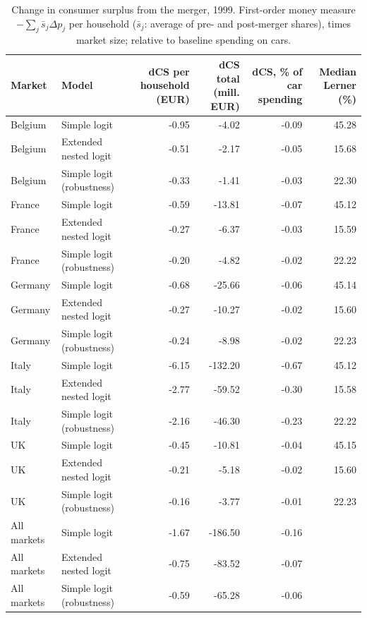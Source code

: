 \begin{table}
\caption{Change in consumer surplus from the merger, 1999. First-order money measure $-\sum_j \bar s_j \Delta p_j$ per household ($\bar s_j$: average of pre- and post-merger shares), times market size; relative to baseline spending on cars.}
\label{tab:consumer_surplus}
\begin{tabular}{llrrrr}
\toprule
Market & Model & dCS per
household (EUR) & dCS total
(mill. EUR) & dCS, \% of
car spending & Median
Lerner (\%) \\
\midrule
Belgium & Simple logit & -0.95 & -4.02 & -0.09 & 45.28 \\
Belgium & Extended nested logit & -0.51 & -2.17 & -0.05 & 15.68 \\
Belgium & Simple logit (robustness) & -0.33 & -1.41 & -0.03 & 22.30 \\
France & Simple logit & -0.59 & -13.81 & -0.07 & 45.12 \\
France & Extended nested logit & -0.27 & -6.37 & -0.03 & 15.59 \\
France & Simple logit (robustness) & -0.20 & -4.82 & -0.02 & 22.22 \\
Germany & Simple logit & -0.68 & -25.66 & -0.06 & 45.14 \\
Germany & Extended nested logit & -0.27 & -10.27 & -0.02 & 15.60 \\
Germany & Simple logit (robustness) & -0.24 & -8.98 & -0.02 & 22.23 \\
Italy & Simple logit & -6.15 & -132.20 & -0.67 & 45.12 \\
Italy & Extended nested logit & -2.77 & -59.52 & -0.30 & 15.58 \\
Italy & Simple logit (robustness) & -2.16 & -46.30 & -0.23 & 22.22 \\
UK & Simple logit & -0.45 & -10.81 & -0.04 & 45.15 \\
UK & Extended nested logit & -0.21 & -5.18 & -0.02 & 15.60 \\
UK & Simple logit (robustness) & -0.16 & -3.77 & -0.01 & 22.23 \\
All markets & Simple logit & -1.67 & -186.50 & -0.16 &  \\
All markets & Extended nested logit & -0.75 & -83.52 & -0.07 &  \\
All markets & Simple logit (robustness) & -0.59 & -65.28 & -0.06 &  \\
\bottomrule
\end{tabular}
\end{table}
